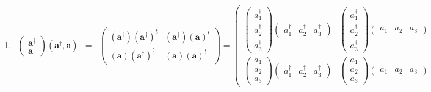 \documentclass[aps,preprint]{revtex4}
\begin{document}
\begin{enumerate}
\begin{enumerate}
\begin{enumerate}
\item 
\begin{eqnarray}
\left( 
\begin{array}{c}
\mathbf{a}^{\dagger } \\ 
\mathbf{a}%
\end{array}%
\right) \left( \mathbf{a}^{\dagger },\mathbf{a}\right) &=&\left( 
\begin{array}{cc}
\left( \mathbf{a}^{\dagger }\right) \left( \mathbf{a}^{\dagger }\right) ^{t}
& \left( \mathbf{a}^{\dagger }\right) \left( \mathbf{a}\right) ^{t} \\ 
\left( \mathbf{a}\right) \left( \mathbf{a}^{\dagger }\right) ^{t} & \left( 
\mathbf{a}\right) \left( \mathbf{a}\right) ^{t}%
\end{array}%
\right) =\left( 
\begin{array}{cc}
\left( 
\begin{array}{c}
a_{1}^{\dagger } \\ 
a_{2}^{\dagger } \\ 
a_{3}^{\dagger }%
\end{array}%
\right) \left( 
\begin{array}{ccc}
a_{1}^{\dagger } & a_{2}^{\dagger } & a_{3}^{\dagger }%
\end{array}%
\right) & \left( 
\begin{array}{c}
a_{1}^{\dagger } \\ 
a_{2}^{\dagger } \\ 
a_{3}^{\dagger }%
\end{array}%
\right) \left( 
\begin{array}{ccc}
a_{1} & a_{2} & a_{3}%
\end{array}%
\right) \\ 
\left( 
\begin{array}{c}
a_{1} \\ 
a_{2} \\ 
a_{3}%
\end{array}%
\right) \left( 
\begin{array}{ccc}
a_{1}^{\dagger } & a_{2}^{\dagger } & a_{3}^{\dagger }%
\end{array}%
\right) & \left( 
\begin{array}{c}
a_{1} \\ 
a_{2} \\ 
a_{3}%
\end{array}%
\right) \left( 
\begin{array}{ccc}
a_{1} & a_{2} & a_{3}%
\end{array}%
\right)%
\end{array}%

\end{eqnarray}
\end{enumerate}
\end{enumerate}
\end{enumerate}
\end{document}
